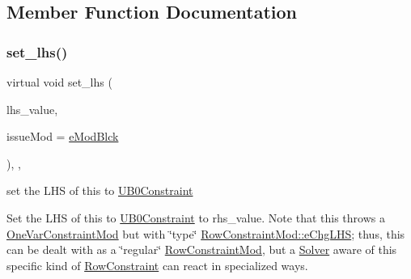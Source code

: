 \subsection{Member Function Documentation}
\mbox{\label{class_s_m_spp__di__unipi__it_1_1_u_b0_constraint_a307924d9ed36541d2a4fc32494c087ee}} 
\subsubsection{\texorpdfstring{set\+\_\+lhs()}{set\_lhs()}}
{\footnotesize\ttfamily virtual void set\+\_\+lhs (\begin{DoxyParamCaption}\item[{\mbox{\hyperlink{class_s_m_spp__di__unipi__it_1_1_row_constraint_a34abd4b01d3a2024be5f6d13dd88779f}{c\+\_\+\+R\+H\+S\+Value}}}]{lhs\+\_\+value,  }\item[{\mbox{\hyperlink{group___modification___t_y_p_e_s_ga544246d8c462e9a2d817c2c30797968f}{c\+\_\+\+Mod\+Param}}}]{issue\+Mod = {\ttfamily \mbox{\hyperlink{group___modification___t_y_p_e_s_gga48fddcdd03a03f49b7e389ca1ed938d4a21b14b26b1c0093a0905f6fc010bad29}{e\+Mod\+Blck}}} }\end{DoxyParamCaption})\hspace{0.3cm}{\ttfamily [final]}, {\ttfamily [override]}, {\ttfamily [virtual]}}



set the L\+HS of this to \mbox{\hyperlink{class_s_m_spp__di__unipi__it_1_1_u_b0_constraint}{U\+B0\+Constraint}} 

Set the L\+HS of this to \mbox{\hyperlink{class_s_m_spp__di__unipi__it_1_1_u_b0_constraint}{U\+B0\+Constraint}} to rhs\+\_\+value. Note that this throws a \mbox{\hyperlink{class_s_m_spp__di__unipi__it_1_1_one_var_constraint_mod}{One\+Var\+Constraint\+Mod}} but with \char`\"{}type\char`\"{} \mbox{\hyperlink{class_s_m_spp__di__unipi__it_1_1_row_constraint_mod_af91e41a206e988d55a31347acd6f5d33a585aad901188269790f584a365b34813}{Row\+Constraint\+Mod\+::e\+Chg\+L\+HS}}; thus, this can be dealt with as a \char`\"{}regular\char`\"{} \mbox{\hyperlink{class_s_m_spp__di__unipi__it_1_1_row_constraint_mod}{Row\+Constraint\+Mod}}, but a \mbox{\hyperlink{class_s_m_spp__di__unipi__it_1_1_solver}{Solver}} aware of this specific kind of \mbox{\hyperlink{class_s_m_spp__di__unipi__it_1_1_row_constraint}{Row\+Constraint}} can react in specialized ways. 

